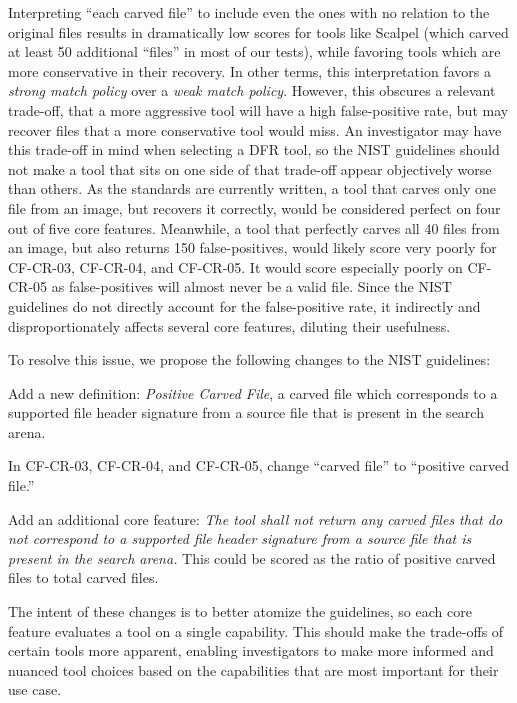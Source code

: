 Interpreting ``each carved file'' to include even the ones with no relation to the original files results in dramatically low scores for tools like Scalpel (which carved at least 50 additional ``files'' in most of our tests), while favoring tools which are more conservative in their recovery.
In other terms, this interpretation favors a \emph{strong match policy} over a \emph{weak match policy}.
However, this obscures a relevant trade-off, that a more aggressive tool will have a high false-positive rate, but may recover files that a more conservative tool would miss.
An investigator may have this trade-off in mind when selecting a DFR tool, so the NIST guidelines should not make a tool that sits on one side of that trade-off appear objectively worse than others.
As the standards are currently written, a tool that carves only one file from an image, but recovers it correctly, would be considered perfect on four out of five core features.
Meanwhile, a tool that perfectly carves all 40 files from an image, but also returns 150 false-positives, would likely score very poorly for CF-CR-03, CF-CR-04, and CF-CR-05.
It would score especially poorly on CF-CR-05 as false-positives will almost never be a valid file.
Since the NIST guidelines do not directly account for the false-positive rate, it indirectly and disproportionately affects several core features, diluting their usefulness.

To resolve this issue, we propose the following changes to the NIST guidelines:
\begin{arabiclist}
 \item Add a new definition: \emph{Positive Carved File}, a carved file which corresponds to a supported file header signature from a source file that is present in the search arena.
 \item In CF-CR-03, CF-CR-04, and CF-CR-05, change ``carved file'' to ``positive carved file.''
 \item Add an additional core feature: \emph{The tool shall not return any carved files that do not correspond to a supported file header signature from a source file that is present in the search arena.} This could be scored as the ratio of positive carved files to total carved files.
\end{arabiclist}

The intent of these changes is to better atomize the guidelines, so each core feature evaluates a tool on a single capability.
This should make the trade-offs of certain tools more apparent, enabling investigators to make more informed and nuanced tool choices based on the capabilities that are most important for their use case.

